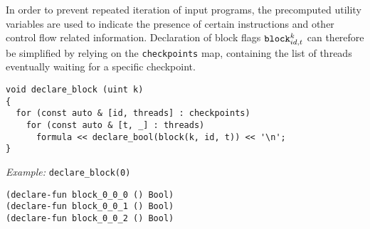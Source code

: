 

\noindent
In order to prevent repeated iteration of input programs,
the precomputed utility variables are used to indicate the presence of certain instructions and other control flow related information.
Declaration of block flags $\texttt{block}^k_{id, t}$ can therefore be simplified by relying on the \texttt{checkpoints} map,
containing the list of threads eventually waiting for a specific checkpoint.

\begin{lstlisting}[style=c++]
void declare_block (uint k)
{
  for (const auto & [id, threads] : checkpoints)
    for (const auto & [t, _] : threads)
      formula << declare_bool(block(k, id, t)) << '\n';
}
\end{lstlisting}

\noindent
\emph{Example:} \lstinline[style=c++]{declare_block(0)}

\begin{lstlisting}[language=smtlib]
(declare-fun block_0_0_0 () Bool)
(declare-fun block_0_0_1 () Bool)
(declare-fun block_0_0_2 () Bool)
\end{lstlisting}

